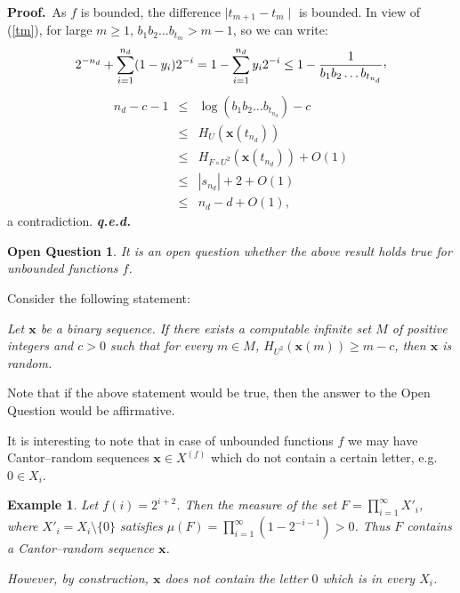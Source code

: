 \documentclass[11pt,a4paper,twoside]{article}
\newcommand{\x}{{\mathbf x}}
\def \XF  {X^{(f)}}
\def \raisecomma {\raisebox{.5ex}{,}}
\newtheorem{open}[theo]{Open Question}
\newtheorem{ex}[theo]{Example}
\newenvironment{proof}{\textbf{Proof.\,}}{\hfill\textbf{\itshape
q.e.d.}\par}
\begin{document}
\begin{proof}
As $f$ is bounded, the difference  $\mid t_{m+1}-  t_{m}\mid$ is bounded.  In view of (\ref{tm}), for large $m\ge 1$,
$b_{1}b_{2}\ldots b_{t_{m}} > m-1$, so we can write:
\begin{equation}
\label{errorcb}
2^{-n_{d}} + \sum_{i=1}^{n_{d}} (1-y_{i})2^{-i} = 1 - \sum_{i=1}^{n_{d}}
y_{i}2^{-i} \le  1 - \frac{1}{b_{1}b_{2}\ldots b_{t_{n_{d}}}}\raisecomma
\end{equation}
\fi
\begin{eqnarray*}
n_{d} - c -1  & \le & \log (b_{1}b_{2}\ldots b_{t_{n_{d}}}) - c\\
 & \le &  H_{U}(\x (t_{n_{d}}))\\
 & \le & H_{F \circ U^{2}} (\x (t_{n_{d}})) + O(1)\\
 & \le & |s_{n_{d}}| +  2 + O(1)\\
& \le & n_{d} -d +  O(1),
\end{eqnarray*}
a contradiction.
\end{proof}


\begin{open} It is an open question whether the above result holds true for unbounded
functions $f$.
\end{open}


Consider the following statement:

 \begin{center}
 \it
 Let $\x$ be a binary sequence. If there exists a computable infinite set
 $M$ of positive integers and $c>0$ such that for every $m\in M$, $H_{U^{2}}(\x(m))
 \ge m-c$, then $\x$ is random.
 \end{center}


 Note that if the above statement would be true,
then the answer to the Open Question would be affirmative.


It is interesting to note that in case of unbounded functions $f$ we
may have Cantor--random sequences $\x\in \XF$ which do not contain a
certain letter, e.g. $0\in X_i$.


\begin{ex}
Let $f(i)= 2^{i+2}$. Then the measure of the set $F=
\prod_{i=1}^\infty X'_i$, where $X'_i=X_i\setminus \{0\}$ satisfies
$\mu(F) = \prod_{i=1}^\infty (1- 2^{-i-1})>0$. Thus $F$ contains a
Cantor--random sequence $\x$.

However, by construction, $\x$ does not contain the letter $0$ which is in every $X_i$.
\end{ex}
\end{document}
